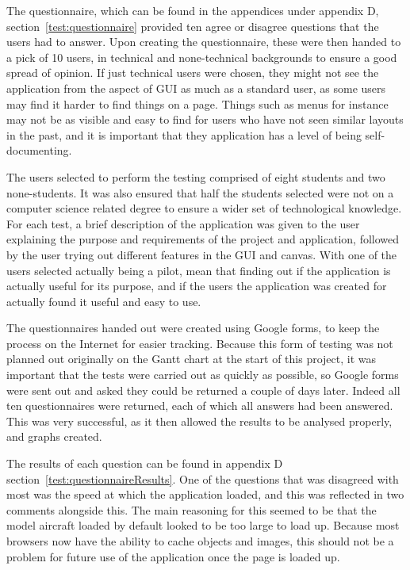 The questionnaire, which can be found in the appendices under appendix D, section~\ref{test:questionnaire} provided ten agree or disagree questions that the users had to answer. Upon creating the questionnaire, these were then handed to a pick of 10 users, in technical and none-technical backgrounds to ensure a good spread of opinion. If just technical users were chosen, they might not see the application from the aspect of GUI as much as a standard user, as some users may find it harder to find things on a page. Things such as menus for instance may not be as visible and easy to find for users who have not seen similar layouts in the past, and it is important that they application has a level of being self-documenting.

The users selected to perform the testing comprised of eight students and two none-students. It was also ensured that half the students selected were not on a computer science related degree to ensure a wider set of technological knowledge. For each test, a brief description of the application was given to the user explaining the purpose and requirements of the project and application, followed by the user trying out different features in the GUI and canvas. With one of the users selected actually being a pilot, mean that finding out if the application is actually useful for its purpose, and if the users the application was created for actually found it useful and easy to use.

The questionnaires handed out were created using Google forms, to keep the process on the Internet for easier tracking. Because this form of testing was not planned out originally on the Gantt chart at the start of this project, it was important that the tests were carried out as quickly as possible, so Google forms were sent out and asked they could be returned a couple of days later. Indeed all ten questionnaires were returned, each of which all answers had been answered. This was very successful, as it then allowed the results to be analysed properly, and graphs created.

The results of each question can be found in appendix D section~\ref{test:questionnaireResults}. One of the questions that was disagreed with most was the speed at which the application loaded, and this was reflected in two comments alongside this. The main reasoning for this seemed to be that the model aircraft loaded by default looked to be too large to load up. Because most browsers now have the ability to cache objects and images, this should not be a problem for future use of the application once the page is loaded up.

